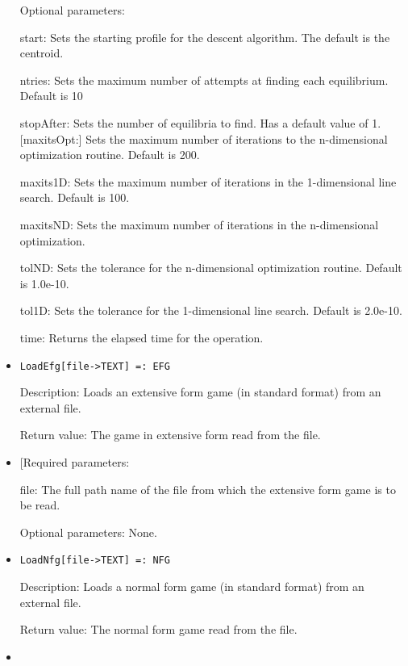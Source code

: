 \begin{itemize}
\item
[Optional parameters:]\hfil\null

\bd
\item
[start:] Sets the starting profile for the descent algorithm.  The
default is the centroid.
\item
[ntries:] Sets the maximum number of attempts at finding each
equilibrium. Default is 10
\item
[stopAfter:] Sets the number of equilibria to find.  Has a default
value of 1.  [maxitsOpt:] Sets the maximum number of iterations to the
n-dimensional optimization routine.  Default is 200.
\item
[maxits1D:] Sets the maximum number of iterations in the
1-dimensional line search.  Default is 100.
\item
[maxitsND:] Sets the maximum number of iterations in the
n-dimensional optimization.  
\item
[tolND:] Sets the tolerance for the n-dimensional optimization
routine.  Default is 1.0e-10.
\item
[tol1D:] Sets the tolerance for the 1-dimensional line search.
Default is 2.0e-10.
\item
[time:] Returns the elapsed time for the operation.
\ed
\ed

\item
\protect \large \begin{verbatim}
LoadEfg[file->TEXT] =: EFG
\end{verbatim}\normalsize

\bd
\item
[Description:] Loads an extensive form game (in standard format) from
an external file.  
\item
[Return value:] The game in extensive form read from the file.
\item

[Required parameters:

\bd
\item
[file:] The full path name of the file from which the extensive form game
is to be read. \ed

\item
[Optional parameters:] None.\hfil\null
\ed

\item
\protect \large \begin{verbatim}
LoadNfg[file->TEXT] =: NFG
\end{verbatim}\normalsize

\bd
\item
[Description:] Loads a normal form game (in standard format) from
an external file.  
\item
[Return value:] The normal form game read from the file.
\item


\end{itemize}
